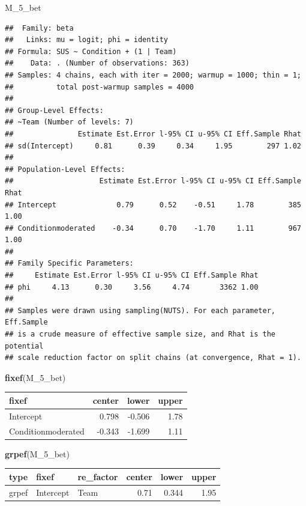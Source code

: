 \documentclass[]{svmono}
\newenvironment{Shaded}{\begin{snugshade}}{\end{snugshade}}
\newcommand{\KeywordTok}[1]{\textcolor[rgb]{0.13,0.29,0.53}{\textbf{#1}}}
\newcommand{\NormalTok}[1]{#1}
\begin{document}
\begin{Shaded}
\begin{Highlighting}[]
\NormalTok{M_5_bet}
\end{Highlighting}
\end{Shaded}

\begin{verbatim}
##  Family: beta 
##   Links: mu = logit; phi = identity 
## Formula: SUS ~ Condition + (1 | Team) 
##    Data: . (Number of observations: 363) 
## Samples: 4 chains, each with iter = 2000; warmup = 1000; thin = 1;
##          total post-warmup samples = 4000
## 
## Group-Level Effects: 
## ~Team (Number of levels: 7) 
##               Estimate Est.Error l-95% CI u-95% CI Eff.Sample Rhat
## sd(Intercept)     0.81      0.39     0.34     1.95        297 1.02
## 
## Population-Level Effects: 
##                    Estimate Est.Error l-95% CI u-95% CI Eff.Sample Rhat
## Intercept              0.79      0.52    -0.51     1.78        385 1.00
## Conditionmoderated    -0.34      0.70    -1.70     1.11        967 1.00
## 
## Family Specific Parameters: 
##     Estimate Est.Error l-95% CI u-95% CI Eff.Sample Rhat
## phi     4.13      0.30     3.56     4.74       3362 1.00
## 
## Samples were drawn using sampling(NUTS). For each parameter, Eff.Sample 
## is a crude measure of effective sample size, and Rhat is the potential 
## scale reduction factor on split chains (at convergence, Rhat = 1).
\end{verbatim}

\begin{Shaded}
\begin{Highlighting}[]
\KeywordTok{fixef}\NormalTok{(M_5_bet)}
\end{Highlighting}
\end{Shaded}

\begin{longtable}[]{@{}lrrr@{}}
\toprule
fixef & center & lower & upper\tabularnewline
\midrule
\endhead
Intercept & 0.798 & -0.506 & 1.78\tabularnewline
Conditionmoderated & -0.343 & -1.699 & 1.11\tabularnewline
\bottomrule
\end{longtable}

\begin{Shaded}
\begin{Highlighting}[]
\KeywordTok{grpef}\NormalTok{(M_5_bet)}
\end{Highlighting}
\end{Shaded}

\begin{longtable}[]{@{}lllrrr@{}}
\toprule
type & fixef & re\_factor & center & lower & upper\tabularnewline
\midrule
\endhead
grpef & Intercept & Team & 0.71 & 0.344 & 1.95\tabularnewline
\bottomrule
\end{longtable}
\end{document}
